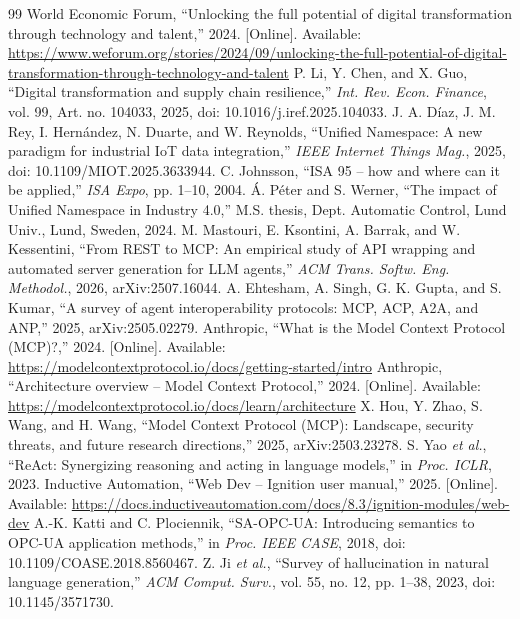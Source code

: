 \documentclass[11pt,letterpaper]{article}
\begin{document}
{\small
\begin{thebibliography}{99}\setlength{\itemsep}{1pt}
 World Economic Forum, ``Unlocking the full potential of digital transformation through technology and talent,'' 2024. [Online]. Available: \url{https://www.weforum.org/stories/2024/09/unlocking-the-full-potential-of-digital-transformation-through-technology-and-talent}
 P. Li, Y. Chen, and X. Guo, ``Digital transformation and supply chain resilience,'' \textit{Int. Rev. Econ. Finance}, vol. 99, Art. no. 104033, 2025, doi: 10.1016/j.iref.2025.104033.
 J. A. Díaz, J. M. Rey, I. Hernández, N. Duarte, and W. Reynolds, ``Unified Namespace: A new paradigm for industrial IoT data integration,'' \textit{IEEE Internet Things Mag.}, 2025, doi: 10.1109/MIOT.2025.3633944.
 C. Johnsson, ``ISA 95 -- how and where can it be applied,'' \textit{ISA Expo}, pp. 1--10, 2004.
 Á. Péter and S. Werner, ``The impact of Unified Namespace in Industry 4.0,'' M.S. thesis, Dept. Automatic Control, Lund Univ., Lund, Sweden, 2024.
 M. Mastouri, E. Ksontini, A. Barrak, and W. Kessentini, ``From REST to MCP: An empirical study of API wrapping and automated server generation for LLM agents,'' \textit{ACM Trans. Softw. Eng. Methodol.}, 2026, arXiv:2507.16044.
 A. Ehtesham, A. Singh, G. K. Gupta, and S. Kumar, ``A survey of agent interoperability protocols: MCP, ACP, A2A, and ANP,'' 2025, arXiv:2505.02279.
 Anthropic, ``What is the Model Context Protocol (MCP)?,'' 2024. [Online]. Available: \url{https://modelcontextprotocol.io/docs/getting-started/intro}
 Anthropic, ``Architecture overview -- Model Context Protocol,'' 2024. [Online]. Available: \url{https://modelcontextprotocol.io/docs/learn/architecture}
 X. Hou, Y. Zhao, S. Wang, and H. Wang, ``Model Context Protocol (MCP): Landscape, security threats, and future research directions,'' 2025, arXiv:2503.23278.
 S. Yao \textit{et al.}, ``ReAct: Synergizing reasoning and acting in language models,'' in \textit{Proc. ICLR}, 2023.
 Inductive Automation, ``Web Dev -- Ignition user manual,'' 2025. [Online]. Available: \url{https://docs.inductiveautomation.com/docs/8.3/ignition-modules/web-dev}
 A.-K. Katti and C. Plociennik, ``SA-OPC-UA: Introducing semantics to OPC-UA application methods,'' in \textit{Proc. IEEE CASE}, 2018, doi: 10.1109/COASE.2018.8560467.
 Z. Ji \textit{et al.}, ``Survey of hallucination in natural language generation,'' \textit{ACM Comput. Surv.}, vol. 55, no. 12, pp. 1--38, 2023, doi: 10.1145/3571730.
\end{thebibliography}
}
\end{document}
